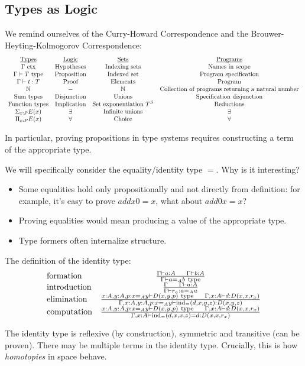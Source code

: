 \subsection{Types as Logic}
We remind ourselves of the Curry-Howard Correspondence and the Brouwer-Heyting-Kolmogorov Correspondence:
\[
\begin{array}{cccc}
\underbar{Types} & \underbar{Logic} & \underbar{Sets} & \underbar{Programs} \\
\Gamma \text{~ctx} & \text{Hypotheses} & \text{Indexing sets} & \text{Names in scope} \\
\Gamma \vdash T ~\mathrm{type} & \text{Proposition} & \text{Indexed set} & \text{Program specification} \\
\Gamma \vdash t : T & \text{Proof} &\text{Elements} & \text{Program} \\
\mathbb{N} & - & \mathbb{N} & \text{Collection of programs returning a natural number} \\
\text{Sum types} & \text{Disjunction} & \text{Unions} & \text{Specification disjunction} \\
\text{Function types} & \text{Implication} & \text{Set exponentiation~}T^S & \text{Reductions} \\
\Sigma_{x: P} E(x) & \exists & \text{Infinite unions} & \exists \\
\Pi_{x: P} E(x) & \forall & \text{Choice} & \forall
\end{array}
\]

In particular, proving propositions in type systems requires constructing a term of the appropriate type.

We will specifically consider the equality/identity type $=$. Why is it interesting?
\begin{itemize}
\item Some equalities hold only propositionally and not directly from definition: for example, it's easy
to prove $add x 0 = x$, what about $add 0 x = x$?
\item Proving equalities would mean producing a value of the appropriate type.
\item Type formers often internalize structure.
\end{itemize}

The definition of the identity type:
\[
\begin{array}{lc}
\text{formation} & \frac{\Gamma \vdash a: A~~~~\Gamma \vdash b : A}{\Gamma \vdash a =_A b ~\mathrm{type}} \\
\text{introduction} & \frac{\Gamma~~~~\Gamma \vdash a: A}{\Gamma \vdash r_a : a =_A a} \\

\text{elimination} & \frac{x : A, y: A, p : x =_A y \vdash D(x, y, p) ~\mathrm{type}~~~~\Gamma, x : A \vdash d : D(x, x, r_x)}
{\Gamma, x : A, y : A, p : x =_A y \vdash \mathrm{ind}_= (d, x, y, z) : D(x, y, z)} \\

\text{computation} & \frac{x : A, y: A, p : x =_A y \vdash D(x, y, p) ~\mathrm{type}~~~~\Gamma, x : A \vdash d : D(x, x, r_x)}
{\Gamma, x : A \vdash \mathrm{ind}_= (d, x, x, z) = d : D(x, x, r_x)}
\end{array}
\]

The identity type is reflexive (by construction), symmetric and transitive (can be proven). There
may be multiple terms in the identity type. Crucially, this is how \emph{homotopies} in space
behave. 